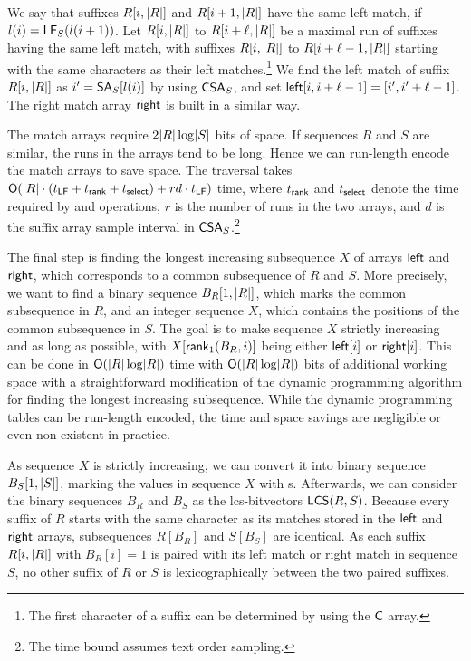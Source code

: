 We say that suffixes $R[i,\lvert R \rvert]$ and $R[i+1,\lvert R \rvert]$ have the same left
match, if $l(i) = \mathsf{LF}_{S}(l(i+1))$. Let $R[i,\lvert R \rvert]$ to $R[i+\ell,\lvert R \rvert]$
be a maximal run of suffixes having the same left match, with suffixes
$R[i,\lvert R \rvert]$ to $R[i+\ell-1,\lvert R \rvert]$ starting with the same characters as
their left matches.\footnote{The first character of a suffix can be determined
by using the $\mathsf{C}$ array.} We find the left match of suffix $R[i,\lvert R \rvert]$ as
$i' = \mathsf{SA}_{S}[l(i)]$ by using $\mathsf{CSA}_{S}$, and set $\mathsf{left}[i,i+\ell-1] =
[i',i'+\ell-1]$. The right match array $\mathsf{right}$ is built in a similar way.

The match arrays require $2\lvert R \rvert \log \lvert S \rvert$ bits of space. If sequences
$R$ and $S$ are similar, the runs in the arrays tend to be long. Hence we can
run-length encode the match arrays to save space. The traversal takes
$\mathsf{O}(\lvert R \rvert \cdot (t_{\mathsf{LF}} + t_{\mathsf{rank}} + t_{\mathsf{select}}) + rd \cdot
t_{\mathsf{LF}})$ time, where $t_{\mathsf{rank}}$ and $t_{\mathsf{select}}$ denote the time
required by \rank{} and \select{} operations, $r$ is the number of runs in the
two arrays, and $d$ is the suffix array sample interval in
$\mathsf{CSA}_{S}$.\footnote{The time bound assumes text order sampling.}

The final step is finding the longest increasing subsequence $X$ of arrays
$\mathsf{left}$ and $\mathsf{right}$, which corresponds to a common subsequence of $R$ and
$S$. More precisely, we want to find a binary sequence $B_{R}[1,\lvert R \rvert]$,
which marks the common subsequence in $R$, and an integer sequence $X$, which
contains the positions of the common subsequence in $S$. The goal is to make
sequence $X$ strictly increasing and as long as possible, with
$X[\mathsf{rank}_{1}(B_{R}, i)]$ being either $\mathsf{left}[i]$ or $\mathsf{right}[i]$. This can
be done in $\mathsf{O}(\lvert R \rvert \log \lvert R \rvert)$ time with $\mathsf{O}(\lvert R \rvert \log \lvert R \rvert)$
bits of additional working space with a straightforward modification of the
dynamic programming algorithm for finding the longest increasing subsequence.
While the dynamic programming tables can be run-length encoded, the time and
space savings are negligible or even non-existent in practice.

As sequence $X$ is strictly increasing, we can convert it into binary sequence
$B_{S}[1,\lvert S \rvert]$, marking the values in sequence $X$ with \onebit{}s.
Afterwards, we can consider the binary sequences $B_{R}$ and $B_{S}$ as the
lcs-bitvectors $\mathsf{LCS}(R,S)$. Because every suffix of $R$ starts with the same
character as its matches stored in the $\mathsf{left}$ and $\mathsf{right}$ arrays,
subsequences $R[B_{R}]$ and $S[B_{S}]$ are identical. As each suffix
$R[i,\lvert R \rvert]$ with $B_{R}[i] = 1$ is paired with its left match or right
match in sequence $S$, no other suffix of $R$ or $S$ is lexicographically
between the two paired suffixes.

